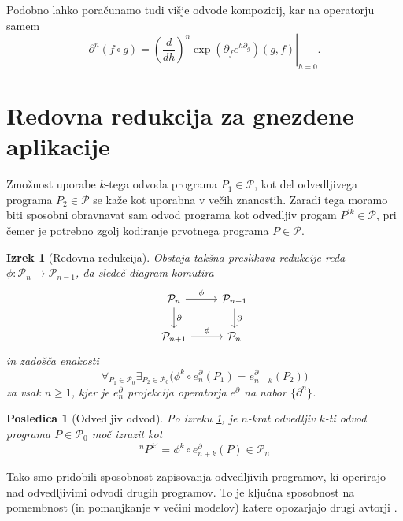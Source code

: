 \documentclass[a4paper, 12pt]{book}
\newcommand{\dP}{\mathcal{P}}
\newcommand{\D}{\partial}
\newtheorem{posledica}{Posledica}[chapter]
\newtheorem{izrek}{Izrek}[chapter]
\begin{document}
Podobno lahko poračunamo tudi višje odvode kompozicij, kar na operatorju samem
 \begin{equation}\label{eq:dkompo}
 \D^n(f\circ g)=\left.\left(\frac{d}{dh}\right)^n\exp\left(\D_fe^{h\D_g}\right)(g,f)\right|_{h=0}.
 \end{equation}

\section{Redovna redukcija za gnezdene aplikacije}\label{sec:orderReduction}

Zmožnost uporabe $k$-tega odvoda programa $P_1\in\dP$, kot del odvedljivega programa $P_2\in\dP$ se kaže kot uporabna v večih znanostih. Zaradi tega moramo biti sposobni obravnavat sam odvod programa kot odvedljiv progam $P^{\prime k}\in\dP$, pri čemer je potrebno zgolj kodiranje prvotnega programa $P\in\dP$.
\begin{izrek}[Redovna redukcija]\label{izr:reductionMap}
Obstaja takšna preslikava redukcije reda $\phi:\dP_n\to \dP_{n-1}$, da sledeč diagram komutira
\begin{equation}\label{eq:reductionMap}
\begin{tikzcd}
  \dP_n \arrow{r}{\phi} \arrow{d}{\D} & 
  \dP_{n-1} \arrow{d}{\D}\\
  \dP_{n+1} \arrow{r}{\phi} & 
  \dP_{n}
\end{tikzcd}
\end{equation}
in zadošča enakosti
\begin{equation*}
\forall_{P_1\in\dP_0}\exists_{P_2\in\dP_0}\Big(\phi^k\circ e^\D_n(P_1)=e^\D_{n-k}(P_2)\Big)
\end{equation*}
za vsak $n\ge 1$, kjer je $e^\D_n$ projekcija operatorja $e^\D$ na nabor $\{\D^n\}$.
\end{izrek}  
\begin{posledica}[Odvedljiv odvod]\label{cor:extraxtDerivatives}
Po izreku \ref{izr:reductionMap}, je $n$-krat odvedljiv $k$-ti odvod programa $P\in\dP_0$ moč izrazit kot
\begin{equation*}
^{n}P^{k\prime}=\phi^k\circ e^\D_{n+k}(P)\in\dP_n
\end{equation*}
\end{posledica}   

Tako smo pridobili sposobnost zapisovanja odvedljivih programov, ki operirajo nad odvedljivimi odvodi drugih programov. To je ključna sposobnost na pomembnost (in pomanjkanje v večini modelov) katere opozarjajo drugi avtorji \cite{AD1}. 
\end{document}
